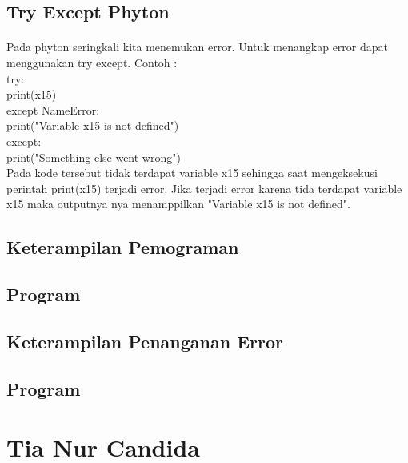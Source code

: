  \subsection{Try Except Phyton}
\paragraph{}
Pada phyton seringkali kita menemukan error. Untuk menangkap error dapat menggunakan try except. Contoh :\\

try:\\
  print(x15)\\
except NameError:\\
  print("Variable x15 is not defined")\\
except:\\
  print("Something else went wrong")\\
  
Pada kode tersebut tidak terdapat variable x15 sehingga saat mengeksekusi perintah print(x15) terjadi error. Jika terjadi error karena tida terdapat variable x15 maka outputnya nya menamppilkan "Variable x15 is not defined".

\subsection{Keterampilan Pemograman}
\subsection{Program}


\subsection{Keterampilan Penanganan Error}
\subsection{Program}


\section{Tia Nur Candida}

